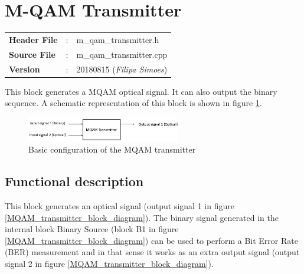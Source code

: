 \clearpage

\section{M-QAM Transmitter}

\begin{tcolorbox}	
	\begin{tabular}{p{2.75cm} p{0.2cm} p{10.5cm}} 	
		\textbf{Header File}   &:& m\_qam\_transmitter.h \\
		\textbf{Source File}   &:& m\_qam\_transmitter.cpp \\
        \textbf{Version}       &:& 20180815 (\emph{Filipa Simoes})\\
	\end{tabular}
\end{tcolorbox}

This block generates a MQAM optical signal. It can also output the binary sequence. A schematic representation of this block is shown in figure \ref{MQAM_transmitter_block_diagram_simple}.

\begin{figure}[h]
	\centering
	\includegraphics[width=0.6\textwidth]{./lib/m_qam_transmitter/figures/MQAM_transmitter_block_diagram_simple}
	\caption{Basic configuration of the MQAM transmitter}\label{MQAM_transmitter_block_diagram_simple}
\end{figure}

\subsection*{Functional description}

This block generates an optical signal (output signal 1 in figure \ref{MQAM_transmitter_block_diagram}). The binary signal generated in the internal block Binary Source (block B1 in figure \ref{MQAM_transmitter_block_diagram}) can be used to perform a Bit Error Rate (BER) measurement and in that sense it works as an extra output signal (output signal 2 in figure \ref{MQAM_transmitter_block_diagram}).


